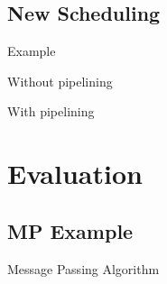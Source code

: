 \documentclass[notes xcolor=dvipsnames]{beamer}
\begin{document}
    \subsection{New Scheduling}
    \begin{frame}{Example}

        Without pipelining
        \begin{figure}
        \end{figure}
             
        With pipelining
        \begin{figure}
        \end{figure}     
        
    \end{frame}

    \section{Evaluation}

    \subsection{MP Example}
    \begin{frame}{Message Passing Algorithm}

        \begin{figure}
        \end{figure}
        
    \end{frame}
\end{document}
